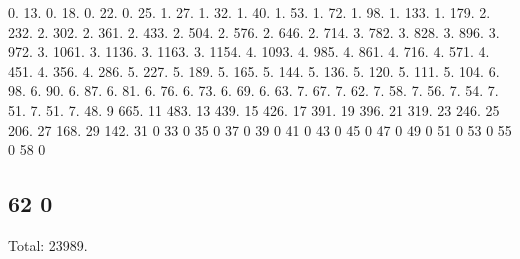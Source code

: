 0. 13. 0. 18. 0. 22. 0. 25. 1. 27. 1. 32. 1. 40. 1. 53. 1. 72. 1. 98. 1. 133. 1. 179. 2. 232. 2. 302. 2. 361. 2. 433. 2. 504. 2. 576. 2. 646. 2. 714. 3. 782. 3. 828. 3. 896. 3. 972. 3. 1061. 3. 1136. 3. 1163. 3. 1154. 4. 1093. 4. 985. 4. 861. 4. 716. 4. 571. 4. 451. 4. 356. 4. 286. 5. 227. 5. 189. 5. 165. 5. 144. 5. 136. 5. 120. 5. 111. 5. 104. 6. 98. 6. 90. 6. 87. 6. 81. 6. 76. 6. 73. 6. 69. 6. 63. 7. 67. 7. 62. 7. 58. 7. 56. 7. 54. 7. 51. 7. 51. 7. 48. 9 665. 11 483. 13 439. 15 426. 17 391. 19 396. 21 319. 23 246. 25 206. 27 168. 29 142. 31 0 33 0 35 0 37 0 39 0 41 0 43 0 45 0 47 0 49 0 51 0 53 0 55 0 58 0 \subsection*{62 0 }

Total\+: 23989. 